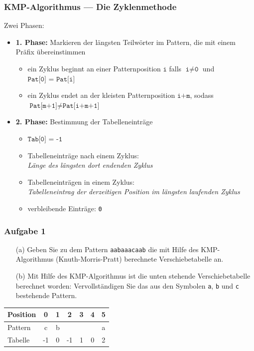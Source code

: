 \documentclass{beamer}
\begin{document}
\begin{frame} \frametitle{KMP-Algorithmus --- Die Zyklenmethode}
	Zwei Phasen:
	\pause
	\begin{itemize}
		\item \textbf{1. Phase:} Markieren der längsten Teilwörter im Pattern, die mit einem Präfix übereinstimmen
		\begin{itemize}
			\item ein Zyklus beginnt an einer Patternposition $\texttt{i}$ falls $\texttt{i} \neq \texttt{0}$ und $\texttt{Pat[0] = Pat[i]}$
			\item ein Zyklus endet an der kleisten Patternposition $\texttt{i+m}$, sodass $\texttt{Pat[m+1]} \neq \texttt{Pat[i+m+1]}$
		\end{itemize}
		\pause
		\item \textbf{2. Phase:} Bestimmung der Tabelleneinträge
		\begin{itemize}
			\item $\texttt{Tab[0] = -1}$
			\item Tabelleneinträge nach einem Zyklus: \\
			\textit{Länge des längsten dort endenden Zyklus}
			\item Tabelleneinträgen in einem Zyklus: \\
			\textit{Tabelleneintrag der derzeitigen Position im längsten laufenden Zyklus}
			\item verbleibende Einträge: \texttt{0}
		\end{itemize}
	\end{itemize}
\end{frame}

\begin{frame} \frametitle{Aufgabe 1}
	
	\begin{itemize}
		\item[(a)] Geben Sie zu dem Pattern \texttt{aabaaacaab} die mit Hilfe des KMP-Algorithmus (Knuth-Morris-Pratt) berechnete Verschiebetabelle an.
		\item[(b)] Mit Hilfe des KMP-Algorithmus ist die unten stehende Verschiebetabelle berechnet worden: Vervollständigen Sie das aus den Symbolen \texttt{a}, \texttt{b} und \texttt{c} bestehende Pattern.
	\end{itemize}
	
	\begin{center}
		\renewcommand*{\arraystretch}{1.1} \setlength{\tabcolsep}{16pt}
		\begin{tabular}{l|cccccc}
			Position &  0 &  1 &  2 &  3 &  4 &  5 \\ \hline
			Pattern  &  c & b  &   &  &  &  a \\ \hline
			Tabelle  & -1 &  0 & -1 & 1 & 0 &  2 \\
		\end{tabular}
	\end{center}
\end{frame}
\end{document}
